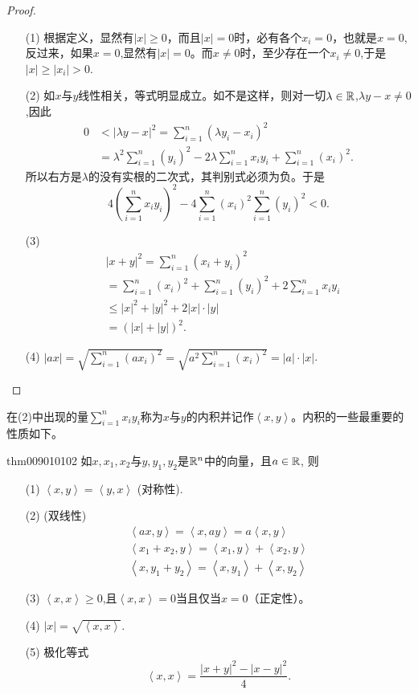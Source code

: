 \begin{proof}
\begin{enumerate}
\item[(1)] 根据定义，显然有$|x| \ge 0$，而且$|x|=0$时，必有各个$x_i=0$，也就是$x=0$,反过来，如果$x=0$,显然有$|x|=0$。而$x \neq 0$时，至少存在一个$x_i \neq 0$,于是$|x| \ge |x_i|>0$.

\item[(2)] 如$x$与$y$线性相关，等式明显成立。如不是这样，则对一切$\lambda \in \mathbb{R}$,$\lambda{}y - x \neq 0$,因此
\[
\begin{aligned}
0 &< |\lambda{}y - x|^2 = \sum_{i=1}^{n}{(\lambda{}y_i - x_i)^2}\\
&= \lambda^2\sum_{i=1}^{n}{(y_i)^2} - 2\lambda\sum_{i=1}^{n}{x_iy_i} + \sum_{i=1}^{n}{(x_i)^2}.
\end{aligned}
\]
所以右方是$\lambda$的没有实根的二次式，其判别式必须为负。于是
\[
4\left(\sum_{i=1}^{n}{x_iy_i}\right)^2 - 4\sum_{i=1}^{n}{(x_i)^2}\sum_{i=1}^{n}{(y_i)^2}<0.
\]

\item[(3)]
\begin{equation*}
\begin{aligned}
&|x + y|^2 = \sum_{i=1}^{n}{(x_i+y_i)^2} \\
& = \sum_{i=1}^{n}{(x_i)^2} + \sum_{i=1}^{n}{(y_i)^2} + 2\sum_{i=1}^{n}{x_iy_i} \\
& \le |x|^2+|y|^2+2|x|\cdot|y| \\
&=(|x|+|y|)^2.
\end{aligned}
\end{equation*}

\item[(4)] $|ax| = \sqrt{\sum\limits_{i=1}^{n}{(ax_i)^2}} = \sqrt{a^2\sum\limits_{i=1}^{n}{(x_i)^2}} = |a|\cdot|x|$.
\end{enumerate}
\end{proof}

在(2)中出现的量$\sum\limits_{i=1}^{n}{x_iy_i}$称为$x$与$y$的内积并记作$\left<x,y\right>$。内积的一些最重要的性质如下。
\begin{theorem}{}{thm009010102}
如$x,x_1,x_2$与$y,y_1,y_2$是$\mathbb{R}^n$中的向量，且$a \in \mathbb{R}$, 则
\begin{enumerate}
\item[(1)] $\left<x,y\right>=\left<y,x\right>$ (对称性).
\item[(2)] (双线性)
\begin{gather*}
\left<ax, y\right> = \left<x, ay\right> = a\left<x, y\right>\\
\left<x_1 + x_2, y\right> = \left<x_1, y\right> + \left<x_2, y\right> \\
\left<x, y_1+y_2\right> = \left<x, y_1\right> + \left<x, y_2\right>
\end{gather*}
\item[(3)] $\left<x, x\right> \ge 0$,且$\left<x, x\right>=0$当且仅当$x=0$（正定性）。
\item[(4)] $|x| = \sqrt{\left<x, x\right>}$.
\item[(5)] 极化等式
\[
\left<x, x\right> = \frac{|x+y|^2 - |x-y|^2}{4}.
\]
\end{enumerate}
\end{theorem}

